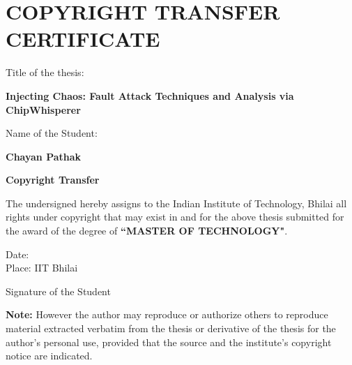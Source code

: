 \chapter*{COPYRIGHT TRANSFER CERTIFICATE}

\noindent
\begin{minipage}[c]{0.4\linewidth}
Title of the thesis: \\
\end{minipage} %
\begin{minipage}[c]{0.6\linewidth}
\textbf{Injecting Chaos: Fault Attack Techniques
and Analysis via ChipWhisperer}\\
\end{minipage}
\vspace{2em}
\noindent
\begin{minipage}[c]{0.4\linewidth}
Name of the Student:
\end{minipage} %
\begin{minipage}[c]{0.6\linewidth}
\textbf{Chayan Pathak}\\
\end{minipage}
\begin{center}
    \textbf{Copyright Transfer}
\end{center}
\vspace{1.5em}

The undersigned hereby assigns to the Indian Institute of Technology, Bhilai all rights under copyright that may exist in and for the above thesis submitted for the award of the degree of \textbf{``MASTER OF TECHNOLOGY"}.\\

\vspace{2em}
\noindent
\begin{minipage}[c]{0.7\linewidth}
Date: \\
Place: IIT Bhilai\\
\end{minipage} 
\begin{minipage}[c]{0.5\linewidth}
Signature of the Student
\end{minipage}

\textbf{Note:} However the author may reproduce or authorize others to reproduce material extracted verbatim from the thesis or derivative of the thesis for the author's personal use, provided that the source and the institute's copyright notice are indicated.
